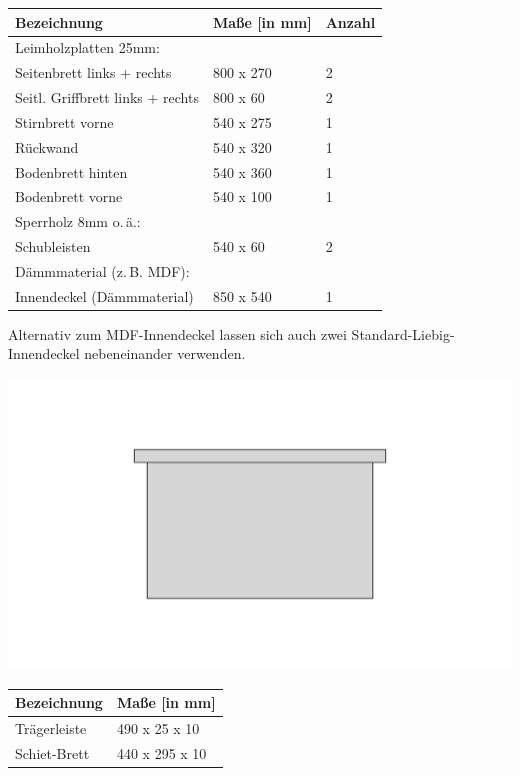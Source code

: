 \documentclass[12pt,a4paper,ngerman]{scrartcl}
\begin{document}

\begin{center}
\begin{tabular}{lll}
  Bezeichnung &                       Maße [in mm] &          Anzahl \\
  \hline
  Leimholzplatten 25mm: \\
  Seitenbrett links + rechts &        800 x 270 &             2 \\
  Seitl. Griffbrett links + rechts &  800 x 60 &              2 \\
  Stirnbrett vorne &                  540 x 275 &             1 \\
  Rückwand &                          540 x 320 &             1 \\
  Bodenbrett hinten &                 540 x 360 &             1 \\
  Bodenbrett vorne &                  540 x 100 &             1 \\
  \hline
  Sperrholz 8mm o.\,ä.: \\
  Schubleisten &                      540 x 60 &          2 \\
  \hline
  Dämmmaterial (z.\,B. MDF): \\
  Innendeckel (Dämmmaterial) &        850 x 540 &             1 \\
  \hline
\end{tabular}
\end{center}

Alternativ zum MDF-Innendeckel lassen sich auch zwei Standard-Liebig-Innendeckel nebeneinander verwenden.



\begin{center}
\includegraphics[width=.5\textwidth]{schiet}

\begin{tabular}{ll}
  Bezeichnung &                       Maße [in mm] \\
  \hline
  Trägerleiste &                      490 x 25 x 10 \\
  Schiet-Brett &                      440 x 295 x 10 \\
  \hline
\end{tabular}
\end{center}
\end{document}
